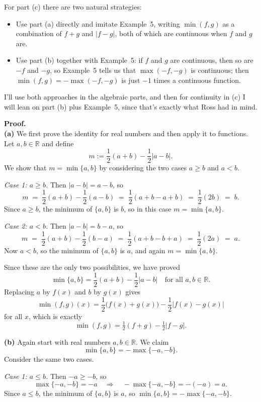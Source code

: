 \documentclass[12pt]{article}
\begin{document}
For part (c) there are two natural strategies:
\begin{itemize}
  \item Use part (a) directly and imitate Example~5, writing $\min(f,g)$
        as a combination of $f+g$ and $|f-g|$, both of which are continuous
        when $f$ and $g$ are.
  \item Use part (b) together with Example~5: if $f$ and $g$ are continuous,
        then so are $-f$ and $-g$, so Example~5 tells us that
        $\max(-f,-g)$ is continuous; then
        $\min(f,g) = -\max(-f,-g)$ is just $-1$ times a continuous function.
\end{itemize}
I’ll use both approaches in the algebraic parts, and then for continuity
in (c) I will lean on part (b) plus Example~5, since that’s exactly what
Ross had in mind.

\vspace{0.5em}

\textbf{Proof.} \\[0.25em]
\textbf{(a)}  We first prove the identity for real numbers and then apply it
to functions.  Let $a,b \in \mathbb{R}$ and define
\[
  m := \frac12(a+b) - \frac12|a-b|.
\]
We show that $m = \min\{a,b\}$ by considering the two cases $a \ge b$ and
$a < b$.

\emph{Case 1: $a \ge b$.} Then $|a-b| = a-b$, so
\[
  m \;=\; \frac12(a+b) - \frac12(a-b)
      \;=\; \frac12(a+b-a+b)
      \;=\; \frac12(2b)
      \;=\; b.
\]
Since $a \ge b$, the minimum of $\{a,b\}$ is $b$, so in this case
$m = \min\{a,b\}$.

\emph{Case 2: $a < b$.} Then $|a-b| = b-a$, so
\[
  m \;=\; \frac12(a+b) - \frac12(b-a)
      \;=\; \frac12(a+b-b+a)
      \;=\; \frac12(2a)
      \;=\; a.
\]
Now $a < b$, so the minimum of $\{a,b\}$ is $a$, and again $m = \min\{a,b\}$.

Since these are the only two possibilities, we have proved
\[
  \min\{a,b\} = \frac12(a+b) - \frac12|a-b|
  \quad \text{for all } a,b \in \mathbb{R}.
\]
Replacing $a$ by $f(x)$ and $b$ by $g(x)$ gives
\[
  \min(f,g)(x)
  = \frac12\big(f(x)+g(x)\big) - \frac12\big|f(x)-g(x)\big|
\]
for all $x$, which is exactly
\[
  \min(f,g) = \tfrac12(f+g) - \tfrac12|f-g|.
\]

\bigskip
\textbf{(b)}  Again start with real numbers $a,b \in \mathbb{R}$.  We claim
\[
  \min\{a,b\} = -\max\{-a,-b\}.
\]
Consider the same two cases.

\emph{Case 1: $a \le b$.} Then $-a \ge -b$, so
\[
  \max\{-a,-b\} = -a
  \quad\Rightarrow\quad
  -\max\{-a,-b\} = -(-a) = a.
\]
Since $a \le b$, the minimum of $\{a,b\}$ is $a$, so
$\min\{a,b\} = -\max\{-a,-b\}$.
\end{document}
